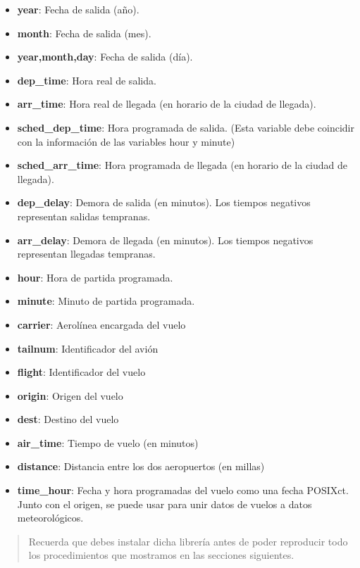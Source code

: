 \documentclass[
]{book}
\providecommand{\tightlist}{%
  \setlength{\itemsep}{0pt}\setlength{\parskip}{0pt}}
\begin{document}
\begin{itemize}
\tightlist
\item
  \textbf{year}: Fecha de salida (año).
\item
  \textbf{month}: Fecha de salida (mes).
\item
  \textbf{year,month,day}: Fecha de salida (día).
\item
  \textbf{dep\_time}: Hora real de salida.
\item
  \textbf{arr\_time}: Hora real de llegada (en horario de la ciudad de llegada).
\item
  \textbf{sched\_dep\_time}: Hora programada de salida. (Esta variable debe coincidir con la información de las variables hour y minute)
\item
  \textbf{sched\_arr\_time}: Hora programada de llegada (en horario de la ciudad de llegada).
\item
  \textbf{dep\_delay}: Demora de salida (en minutos). Los tiempos negativos representan salidas tempranas.
\item
  \textbf{arr\_delay}: Demora de llegada (en minutos). Los tiempos negativos representan llegadas tempranas.
\item
  \textbf{hour}: Hora de partida programada.
\item
  \textbf{minute}: Minuto de partida programada.
\item
  \textbf{carrier}: Aerolínea encargada del vuelo
\item
  \textbf{tailnum}: Identificador del avión
\item
  \textbf{flight}: Identificador del vuelo
\item
  \textbf{origin}: Origen del vuelo
\item
  \textbf{dest}: Destino del vuelo
\item
  \textbf{air\_time}: Tiempo de vuelo (en minutos)
\item
  \textbf{distance}: Distancia entre los dos aeropuertos (en millas)
\item
  \textbf{time\_hour}: Fecha y hora programadas del vuelo como una fecha POSIXct. Junto con el origen, se puede usar para unir datos de vuelos a datos meteorológicos.
\end{itemize}

\begin{quote}
Recuerda que debes instalar dicha librería antes de poder reproducir todo los procedimientos que mostramos en las secciones siguientes.
\end{quote}
\end{document}
